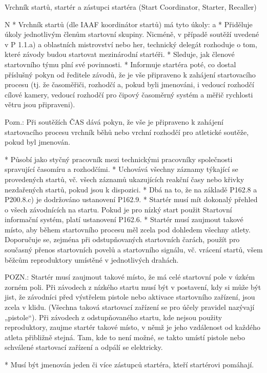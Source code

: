 \secc Vrchník startů, startér a zástupci startéra (Start Coordinator, Starter, Recaller)

\begitems \style N
* Vrchník startů (dle IAAF koordinátor startů) má tyto úkoly:
  \begitems \style a
  * Přiděluje úkoly jednotlivým členům startovní skupiny. Nicméně, v případě soutěží uvedené v P 1.1.a) a oblastních mistrovství nebo her, technický delegát rozhoduje o tom, které závody budou startovat mezinárodní startéři.
  * Sleduje, jak členové startovního týmu plní své povinnosti.
  * Informuje startéra poté, co dostal příslušný pokyn od ředitele závodů, že je vše připraveno k zahájení startovacího procesu (tj. že časoměřiči, rozhodčí a, pokud byli jmenováni, i vedoucí rozhodčí cílové kamery, vedoucí rozhodčí pro čipový časoměrný systém a měřič rychlosti větru jsou připraveni).

  Pozn.: Při soutěžích ČAS dává pokyn, že vše je připraveno k zahájení startovacího procesu vrchník běhů nebo vrchní rozhodčí pro atletické soutěže, pokud byl jmenován.

  * Působí jako styčný pracovník mezi technickými pracovníky společnosti spravující časomíru a rozhodčími.
  * Uchovává všechny záznamy týkající se provedených startů, vč. všech záznamů ukazujících reakční časy nebo křivky nezdařených startů, pokud jsou k dispozici.
  * Dbá na to, že na základě P162.8 a P200.8.c) je dodržováno ustanovení P162.9.
  \enditems
* Startér musí mít dokonalý přehled o všech závodnících na startu. Pokud je pro nízký start použit Startovní informační systém, platí ustanovení P162.6.
* Startér musí zaujmout takové místo, aby během startovního procesu měl zcela pod dohledem všechny atlety. Doporučuje se, zejména při odstupňovaných startovních čarách, použít pro současný přenos startovních povelů a startovního signálu, vč. vrácení startů, všem běžcům reproduktory umístěné v jednotlivých drahách.

POZN.: Startér musí zaujmout takové místo, že má celé startovní pole v úzkém zorném poli. Při závodech z nízkého startu musí být v postavení, kdy si může být jist, že závodníci před výstřelem pistole nebo aktivace startovního zařízení, jsou zcela v klidu. (Všechna taková startovací zařízení se pro účely pravidel nazývají „pistole“). Při závodech z odstupňovaného startu, kde nejsou použity reproduktory, zaujme startér takové místo, v němž je jeho vzdálenost od každého atleta přibližně stejná. Tam, kde to není možné, se takto umístí pistole nebo schválené startovací zařízení a odpálí se elektricky.

* Musí být jmenován jeden či více zástupců startéra, kteří startérovi pomáhají.

